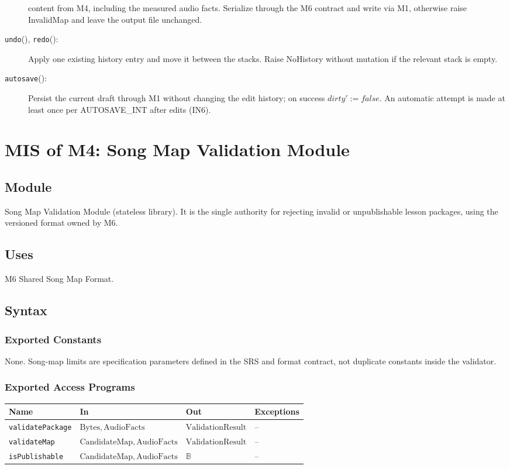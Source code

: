 \documentclass[12pt, titlepage]{article}
\begin{document}
\begin{description}
content from M4, including the measured audio facts.
Serialize through the M6 contract and
write via M1, otherwise raise InvalidMap and leave the
output file unchanged.
\item[\texttt{undo}(), \texttt{redo}():] Apply one existing
history entry and move it between the stacks. Raise NoHistory
without mutation if the relevant stack is empty.
\item[\texttt{autosave}():] Persist the current draft through
M1 without changing the edit history; on success
$dirty':=\mathit{false}$. An automatic attempt is made
at least once per AUTOSAVE\_INT after edits (IN6).
\end{description}

\clearpage
\section{MIS of M4: Song Map Validation Module} \label{MISM4}

\subsection{Module}
Song Map Validation Module (stateless library). It is the single
authority for rejecting invalid or unpublishable lesson packages,
using the versioned format owned by M6.

\subsection{Uses}
M6 Shared Song Map Format.

\subsection{Syntax}
\subsubsection{Exported Constants}
None. Song-map limits are specification parameters defined
in the SRS and format contract, not duplicate constants
inside the validator.

\subsubsection{Exported Access Programs}
\begin{center}
\small
\begin{tabularx}{\textwidth}{@{}p{}p{}p{}X@{}}
\toprule
\textbf{Name} & \textbf{In} & \textbf{Out} & \textbf{Exceptions}\\
\midrule
\texttt{validatePackage} & $\mathrm{Bytes},
\mathrm{AudioFacts}$ &
$\mathrm{ValidationResult}$ & --\\
\texttt{validateMap} & $\mathrm{CandidateMap},
\mathrm{AudioFacts}$ &
$\mathrm{ValidationResult}$ & --\\
\texttt{isPublishable} & $\mathrm{CandidateMap},
\mathrm{AudioFacts}$ &
$\mathbb{B}$ & --\\
\bottomrule
\end{tabularx}
\normalsize
\end{center}
\end{document}
